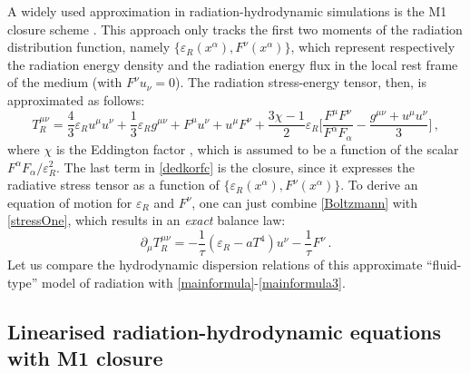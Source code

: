\documentclass[a4paper, amsfonts, amssymb, amsmath, reprint, showkeys, nofootinbib, twoside,notitlepage,onecolumn]{revtex4-2}
\theoremstyle{definition}
\theoremstyle{theorem}
\theoremstyle{corollary}
\begin{document}
A widely used approximation in radiation-hydrodynamic simulations is the M1 closure scheme \cite{Minerbo1978,Levermore1984,Sadowski2013,Fragile:2014bfa,Fragile:2018xee,Murchikova:2017zsy,Anninos2020,GavassinoRadiazione}. This approach only tracks the first two moments of the radiation distribution function, namely $\{\varepsilon_R(x^\alpha),F^\nu(x^\alpha)\}$, which represent respectively the radiation energy density and the radiation energy flux in the local rest frame of the medium  (with $F^\nu u_\nu =0$). The radiation stress-energy tensor, then, is approximated as follows: 
\begin{equation}\label{dedkorfc}
T_R^{\mu \nu}= \dfrac{4}{3} \varepsilon_R u^\mu u^\nu +\dfrac{1}{3}\varepsilon_R g^{\mu \nu } +F^\mu u^\nu + u^\mu F^\nu+ \dfrac{3\chi{-}1}{2} \varepsilon_R \bigg[ \dfrac{F^\mu F^\nu}{F^\alpha F_\alpha} {-}\dfrac{g^{\mu \nu} {+}u^\mu u^\nu}{3} \bigg] \, , 
\end{equation}
where $\chi$ is the Eddington factor \cite{Minerbo1978,Levermore1984}, which is assumed to be a function of the scalar $F^\alpha F_\alpha/\varepsilon_R^2$. The last term in \eqref{dedkorfc} is the closure, since it expresses the radiative stress tensor as a function of $\{\varepsilon_R(x^\alpha),F^\nu(x^\alpha)\}$. To derive an equation of motion for $\varepsilon_R$ and $F^\nu$, one can just combine \eqref{Boltzmann} with \eqref{stressOne}, which results in an \textit{exact} balance law:
\begin{equation}\label{basilisco}
\partial_\mu T_R^{\mu \nu}= -\dfrac{1}{\tau} (\varepsilon_R {-}aT^4) u^\nu -\dfrac{1}{\tau} F^\nu \, .
\end{equation}
Let us compare the hydrodynamic dispersion relations of this approximate ``fluid-type'' model of radiation with \eqref{mainformula}-\eqref{mainformula3}.

\subsection{Linearised radiation-hydrodynamic equations with M1 closure}
\end{document}
